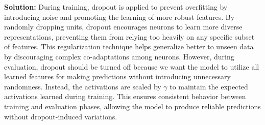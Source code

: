 \begin{parts}
\begin{subparts}
            {\color{red} \textbf{Solution:} \newline
                During training, dropout is applied to prevent overfitting by introducing noise and promoting the learning of more robust features. By randomly dropping units, dropout encourages neurons to learn more diverse representations, preventing them from relying too heavily on any specific subset of features. This regularization technique helps generalize better to unseen data by discouraging complex co-adaptations among neurons. However, during evaluation, dropout should be turned off because we want the model to utilize all learned features for making predictions without introducing unnecessary randomness. Instead, the activations are scaled by $\gamma$ to maintain the expected activations learned during training. This ensures consistent behavior between training and evaluation phases, allowing the model to produce reliable predictions without dropout-induced variations.
            }
         
        \end{subparts}


\end{parts}
